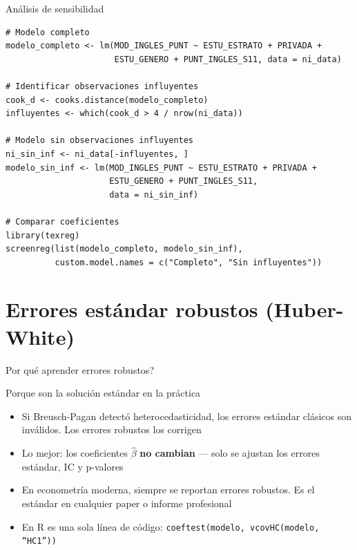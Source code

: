 \documentclass[aspectratio=169, 11pt]{beamer}
\begin{document}
\begin{frame}[fragile]{Análisis de sensibilidad}
\small
\begin{lstlisting}
# Modelo completo
modelo_completo <- lm(MOD_INGLES_PUNT ~ ESTU_ESTRATO + PRIVADA +
                      ESTU_GENERO + PUNT_INGLES_S11, data = ni_data)

# Identificar observaciones influyentes
cook_d <- cooks.distance(modelo_completo)
influyentes <- which(cook_d > 4 / nrow(ni_data))

# Modelo sin observaciones influyentes
ni_sin_inf <- ni_data[-influyentes, ]
modelo_sin_inf <- lm(MOD_INGLES_PUNT ~ ESTU_ESTRATO + PRIVADA +
                     ESTU_GENERO + PUNT_INGLES_S11,
                     data = ni_sin_inf)

# Comparar coeficientes
library(texreg)
screenreg(list(modelo_completo, modelo_sin_inf),
          custom.model.names = c("Completo", "Sin influyentes"))
\end{lstlisting}
\end{frame}

\section{Errores est\'andar robustos (Huber-White)}

\begin{frame}{\textquestiondown{}Por qu\'e aprender errores robustos?}
\begin{exampleblock}{Porque son la soluci\'on est\'andar en la pr\'actica}
\small
\begin{itemize}\setlength{\itemsep}{2pt}
  \item Si Breusch-Pagan detect\'o heterocedasticidad, los errores est\'andar cl\'asicos son inv\'alidos. Los errores robustos los corrigen
  \item Lo mejor: los coeficientes $\hat{\beta}$ \textbf{no cambian} --- solo se ajustan los errores est\'andar, IC y p-valores
  \item En econometr\'ia moderna, siempre se reportan errores robustos. Es el est\'andar en cualquier paper o informe profesional
  \item En R es una sola l\'inea de c\'odigo: \texttt{coeftest(modelo, vcovHC(modelo, ``HC1''))}
\end{itemize}
\end{exampleblock}
\end{frame}
\end{document}
